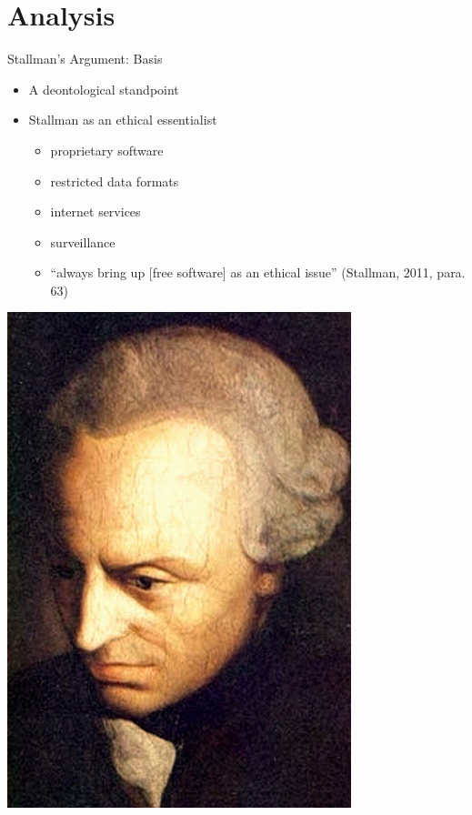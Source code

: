 \section{Analysis}\frame{\sectionpage}

\begin{frame}{Stallman's Argument: Basis}
\begin{minipage}{0.5\textwidth}
\begin{itemize}
    \item A deontological standpoint
    \item Stallman as an ethical essentialist
    \begin{itemize}
      \item proprietary software
      \item restricted data formats
      \item internet services 
      \item surveillance 
    \end{itemize}
   \begin{itemize}
        \item ``always bring up [free software] as an ethical issue''
          (Stallman, 2011, para. 63)
      \end{itemize}  
  \end{itemize}
\end{minipage} %
\begin{minipage}{0.45\textwidth}
  \includegraphics[width = 0.75\textwidth]{kant.jpg}
\end{minipage}
\end{frame}


